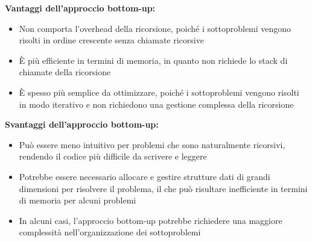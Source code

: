 \documentclass[12pt,oneside,a4paper]{article}
\begin{document}
\textbf{Vantaggi dell'approccio bottom-up:}
\begin{itemize}
\item Non comporta l'overhead della ricorsione, poiché i sottoproblemi vengono risolti in ordine crescente senza chiamate ricorsive
\item È più efficiente in termini di memoria, in quanto non richiede lo stack di chiamate della ricorsione
\item È spesso più semplice da ottimizzare, poiché i sottoproblemi vengono risolti in modo iterativo e non richiedono una gestione complessa della ricorsione
\end{itemize}
\textbf{Svantaggi dell'approccio bottom-up:}
\begin{itemize}
\item Può essere meno intuitivo per problemi che sono naturalmente ricorsivi, rendendo il codice più difficile da scrivere e leggere
\item Potrebbe essere necessario allocare e gestire strutture dati di grandi dimensioni per risolvere il problema, il che può risultare inefficiente in termini di memoria per alcuni problemi
\item In alcuni casi, l'approccio bottom-up potrebbe richiedere una maggiore complessità nell'organizzazione dei sottoproblemi
\end{itemize}
\end{document}
